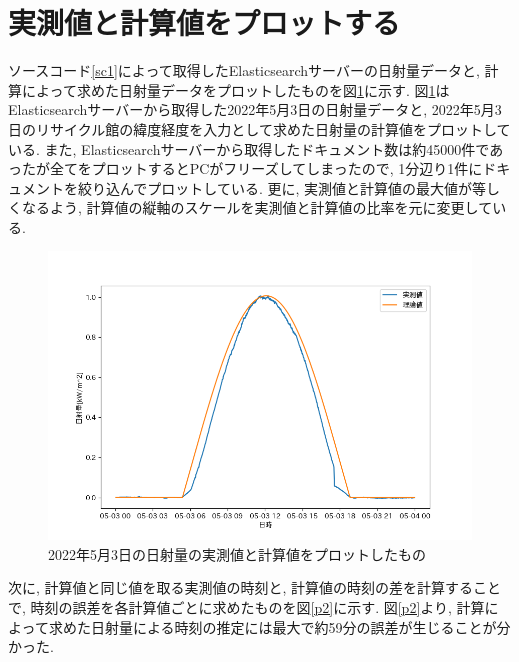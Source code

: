 \documentclass[a4j,12pt,]{jarticle}
\begin{document}
\section{実測値と計算値をプロットする}
ソースコード\ref{sc1}によって取得したElasticsearchサーバーの日射量データと, 計算によって求めた日射量データをプロットしたものを図\ref{p1}に示す.
図\ref{p1}はElasticsearchサーバーから取得した2022年5月3日の日射量データと, 2022年5月3日のリサイクル館の緯度経度を入力として求めた日射量の計算値をプロットしている.
また, Elasticsearchサーバーから取得したドキュメント数は約45000件であったが全てをプロットするとPCがフリーズしてしまったので, 1分辺り1件にドキュメントを絞り込んでプロットしている.
更に, 実測値と計算値の最大値が等しくなるよう, 計算値の縦軸のスケールを実測値と計算値の比率を元に変更している.

\begin{figure}[H]
  \begin{center}
    \includegraphics[width=160mm]{compare.png}
    \caption{2022年5月3日の日射量の実測値と計算値をプロットしたもの}
    \label{p1}
  \end{center}
\end{figure}

次に, 計算値と同じ値を取る実測値の時刻と, 計算値の時刻の差を計算することで, 時刻の誤差を各計算値ごとに求めたものを図\ref{p2}に示す.
図\ref{p2}より, 計算によって求めた日射量による時刻の推定には最大で約59分の誤差が生じることが分かった.
\end{document}
